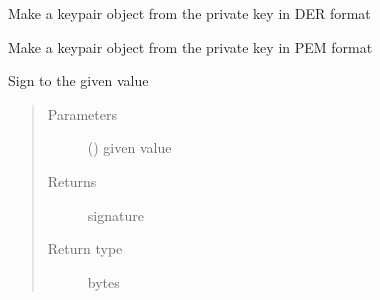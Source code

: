 \documentclass[letterpaper,10pt,english]{sphinxmanual}
\begin{document}
\begin{fulllineitems}
\begin{fulllineitems}
\label{\detokenize{bbc1.core.bbclib:bbc1.core.bbclib.KeyPair.mk_keyobj_from_private_key_der}}
Make a keypair object from the private key in DER format

\end{fulllineitems}


\begin{fulllineitems}
\label{\detokenize{bbc1.core.bbclib:bbc1.core.bbclib.KeyPair.mk_keyobj_from_private_key_pem}}
Make a keypair object from the private key in PEM format

\end{fulllineitems}


\begin{fulllineitems}
\label{\detokenize{bbc1.core.bbclib:bbc1.core.bbclib.KeyPair.sign}}
Sign to the given value
\begin{quote}\begin{description}
\item[{Parameters}] \leavevmode
{} () \textendash{} given value

\item[{Returns}] \leavevmode
signature

\item[{Return type}] \leavevmode
bytes

\end{description}\end{quote}

\end{fulllineitems}


\begin{fulllineitems}
\label{\detokenize{bbc1.core.bbclib:bbc1.core.bbclib.KeyPair.to_bigint}}
\end{fulllineitems}


\end{fulllineitems}
\end{document}
